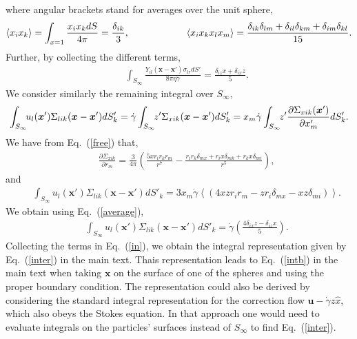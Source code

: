 where angular brackets stand for averages over the unit sphere,
\begin{equation} %
  \small
\left\langle x_ix_k\right\rangle=\int_{x=1} \frac{x_ix_k dS}{4\pi}=\frac{\delta_{ik}}{3},\ \
\left\langle x_ix_kx_lx_m\right\rangle=\frac{\delta_{ik}\delta_{lm}+\delta_{il}\delta_{km}+\delta_{im}\delta_{kl}}{15}.\label{average}
\end{equation}
Further, by collecting the different terms,
\begin{eqnarray}&&\!\!\!\!\!\!\!\!\!\!\!\!
\int_{S_{\infty}}\!\!\frac{Y_{il}(\bm x\!-\!\bm x')\sigma_{lr}dS'}{8\pi \eta \dot{\gamma}}\!=\!\frac{\delta_{iz}x+\delta_{ix}z}{5}.
\end{eqnarray}
We consider similarly the remaining integral over $S_{\infty}$,
\begin{equation} %
  \small
\int_{S_{\infty}}\!\!u_l(\bm x')\Sigma_{lik}(\bm x- \bm x') dS'_k=\dot{\gamma}\int_{S_{\infty}}\!\!z'\Sigma_{xik}(\bm x- \bm x') dS'_k
=x_m\dot{\gamma}\int_{S_{\infty}}\!\!z'\frac{\partial \Sigma_{xik}(\bm x')}{\partial x'_m} dS'_k.
\end{equation}
We have from Eq.~(\ref{free}) that,
\begin{eqnarray}&&\!\!\!\!\!\!\!\!\!\!
\frac{\partial \Sigma_{xik}}{\partial r_m}\!=\!\frac{3}{4\pi}\left(\frac{5x r_ir_kr_m}{r^7}\!-\!\frac{r_ir_k\delta_{mx}\!+\!r_ix\delta_{mk}\!+\!r_kx\delta_{mi}}{r^5}\right),\nonumber
\end{eqnarray}
and
\begin{eqnarray}&&\!\!\!\!\!\!\!\!\!\!
\int_{S_{\infty}}\!\!u_l(\bm x')\Sigma_{lik}(\bm x- \bm x') dS'_k=3x_m\dot{\gamma}\left\langle\left( 4x z r_ir_m -zr_i\delta_{mx}
-xz\delta_{mi}\right) \right  \rangle.
\end{eqnarray}
We obtain using Eq.~(\ref{average}),
\begin{eqnarray}&&\!\!\!\!\!\!\!\!\!\!
\int_{S_{\infty}}\!\!u_l(\bm x')\Sigma_{lik}(\bm x- \bm x') dS'_k=\dot{\gamma}\left(\frac{4\delta_{ix}z-\delta_{iz}x}{5}\right).
\end{eqnarray}
Collecting the terms in Eq.~(\ref{in}), we obtain the integral representation given by Eq.~(\ref{inter}) in the main text. Thais representation leads to Eq.~(\ref{intb}) in the main text when taking $\bm x$ on the surface of one of the spheres and using the proper boundary condition. The representation could also be derived by considering the standard integral representation \label{ps,kim_karrila} for the correction flow $\bm u-\dot{\gamma} z{\hat x}$, which also obeys the Stokes equation. In that approach one would need to evaluate integrals on the particles' surfaces instead of $S_{\infty}$ to find Eq.~(\ref{inter}).

